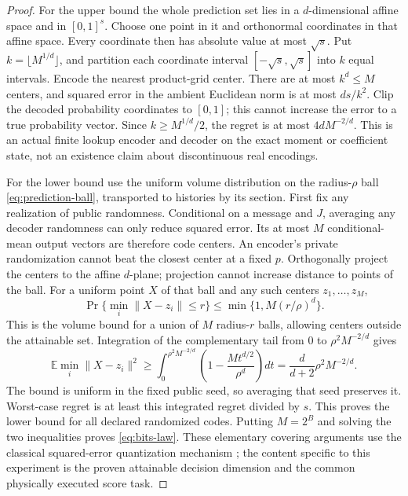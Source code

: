 \begin{proof}
For the upper bound the whole prediction set lies in a $d$-dimensional
affine space and in $[0,1]^s$. Choose one point in it and orthonormal
coordinates in that affine space. Every coordinate then has absolute value
at most $\sqrt s$. Put $k=\lfloor M^{1/d}\rfloor$, and partition each
coordinate interval $[-\sqrt s,\sqrt s]$ into $k$ equal intervals. Encode
the nearest product-grid center. There are at most $k^d\le M$ centers,
and squared error in the ambient Euclidean norm is at most $ds/k^2$.
Clip the decoded probability coordinates to $[0,1]$; this cannot increase
the error to a true probability vector. Since $k\ge M^{1/d}/2$, the
regret is at most $4dM^{-2/d}$. This is an actual finite lookup encoder and
decoder on the exact moment or coefficient state, not an existence claim
about discontinuous real encodings.

For the lower bound use the uniform volume distribution on the radius-$\rho$
ball \eqref{eq:prediction-ball}, transported to histories by its section.
First fix any realization of public randomness. Conditional on a message
and $J$, averaging any decoder randomness can only reduce squared error.
Its at most $M$ conditional-mean output vectors are therefore code centers.
An encoder's private randomization cannot beat the closest center at a
fixed $p$. Orthogonally project the centers to the affine $d$-plane;
projection cannot increase distance to points of the ball. For a uniform
point $X$ of that ball and any such centers $z_1,\ldots,z_M$,
\[
 \Pr\{\min_i\|X-z_i\|\le r\}
 \le\min\{1,M(r/\rho)^d\}.
\]
This is the volume bound for a union of $M$ radius-$r$ balls, allowing
centers outside the attainable set. Integration of the complementary tail
from $0$ to $\rho^2M^{-2/d}$ gives
\[
 \mathbb E\min_i\|X-z_i\|^2
 \ge\int_0^{\rho^2M^{-2/d}}
       \left(1-\frac{M t^{d/2}}{\rho^d}\right)dt
 =\frac d{d+2}\rho^2M^{-2/d}.
\]
The bound is uniform in the fixed public seed, so averaging that seed
preserves it. Worst-case regret is at least this integrated regret divided
by $s$. This proves the lower bound for all declared randomized codes.
Putting $M=2^B$ and solving the two inequalities proves
\eqref{eq:bits-law}. These elementary covering arguments use the classical
squared-error quantization mechanism \cite{GrafLuschgy}; the content
specific to this experiment is the proven attainable decision dimension
and the common physically executed score task.
\end{proof}

